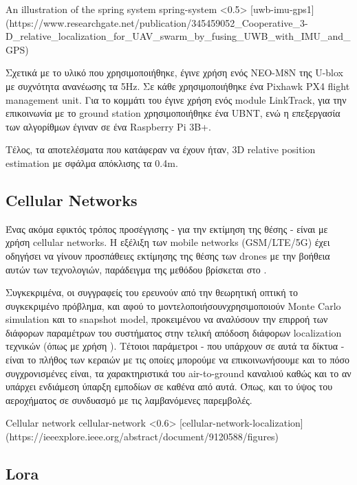 {An illustration of the spring system}%
{spring-system}%
<0.5>%
[uwb-imu-gps1]%
(https://www.researchgate.net/publication/345459052_Cooperative_3-D_relative_localization_for_UAV_swarm_by_fusing_UWB_with_IMU_and_GPS)

Σχετικά με το υλικό που χρησιμοποιήθηκε, έγινε χρήση ενός NEO-M8N  της U-blox με συχνότητα ανανέωσης τα 5Hz.  
Σε κάθε  χρησιμοποιήθηκε ένα Pixhawk PX4 flight management unit. Για το κομμάτι του  έγινε χρήση
ενός module LinkTrack, για την επικοινωνία με το ground station χρησιμοποιήθηκε ένα UBNT, ενώ η επεξεργασία των 
αλγορίθμων έγιναν σε ένα Raspberry Pi 3B+. 

Τέλος, τα αποτελέσματα που κατάφεραν να έχουν ήταν, 3D relative position estimation με σφάλμα απόκλισης τα 0.4m. 

\subsection{Cellular Networks}
Ένας ακόμα εφικτός τρόπος προσέγγισης - για την εκτίμηση της θέσης - είναι με χρήση
cellular networks. Η εξέλιξη των mobile networks (GSM/LTE/5G) έχει οδηγήσει να γίνουν προσπάθειες εκτίμησης
της θέσης των drones με την βοήθεια αυτών των τεχνολογιών, παράδειγμα της μεθόδου βρίσκεται στο . 

Συγκεκριμένα, οι συγγραφείς του \cite{cellular-network-localization} ερευνούν από την θεωρητική οπτική το συ\-γκε\-κρι\-μένο πρόβλημα, 
και αφού το μοντελοποιήσουν\udot χρησιμοποιούν Monte Carlo simulation και το snapshot model, προκειμένου να αναλύσουν την επιρροή 
των διάφορων παραμέτρων του συστήματος στην τελική απόδοση διάφορων localization τεχνικών (όπως με χρήση ). Τέτοιοι 
παράμετροι - που υπάρχουν σε αυτά τα δίκτυα - είναι το πλήθος των κεραιών με τις οποίες μπορούμε να επικοινωνήσουμε και το πόσο συγχρονισμένες 
είναι, τα χαρακτηριστικά του air-to-ground καναλιού καθώς και το αν υπάρχει ενδιάμεση ύπαρξη εμποδίων σε καθένα από αυτά. Όπως, και το 
ύψος του αεροχήματος σε συνδυασμό με τις λαμβανόμενες παρεμβολές.

{Cellular network}%
{cellular-network}%
<0.6>%
[cellular-network-localization]%
(https://ieeexplore.ieee.org/abstract/document/9120588/figures)

\subsection{Lora}

